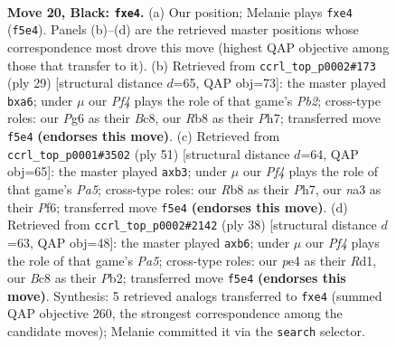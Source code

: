\documentclass[11pt]{article}
\begin{document}
\clearpage

\begin{figure}[p]\centering
\begin{subfigure}{0.46\textwidth}\centering
\resizebox{\linewidth}{!}{%
\newchessgame
\chessboard[
  setfen={1rb2r2/pp4k1/6pp/2pBbp1n/4P2P/N5P1/PP1PKP2/R1B1R3 b - - 0 20},
  showmover=false,
  pgfstyle=straightmove, color=movearrow, markmove={f5-e4}
]}
\caption{}
\end{subfigure}\hfill
\begin{subfigure}{0.46\textwidth}\centering
\resizebox{\linewidth}{!}{%
\newchessgame
\chessboard[
  setfen={r1br4/pp2kppp/P3p3/1Bbn4/8/2P2N2/1P2KPPP/R1BR4 b - - 0 15},
  showmover=false,
  pgfstyle=straightmove, color=movearrow, markmove={b7-a6}
]}
\caption{}
\end{subfigure}
\\[4pt]
\begin{subfigure}{0.46\textwidth}\centering
\resizebox{\linewidth}{!}{%
\newchessgame
\chessboard[
  setfen={rr4k1/3p2pp/2b1pp2/8/pnP4P/1P3P2/P5P1/1R1RBBK1 b - - 0 26},
  showmover=false,
  pgfstyle=straightmove, color=movearrow, markmove={a4-b3}
]}
\caption{}
\end{subfigure}\hfill
\begin{subfigure}{0.46\textwidth}\centering
\resizebox{\linewidth}{!}{%
\newchessgame
\chessboard[
  setfen={7r/p2rkp2/1p1bpn1p/P1pb4/8/4BNPP/1P2PPB1/R2R2K1 w - - 1 20},
  showmover=false,
  pgfstyle=straightmove, color=movearrow, markmove={a5-b6}
]}
\caption{}
\end{subfigure}
\caption{\textbf{Move 20, Black: \texttt{fxe4}.} (a) Our position; Melanie plays \texttt{fxe4} (\texttt{f5e4}). Panels (b)--(d) are the retrieved master positions whose correspondence most drove this move (highest QAP objective among those that transfer to it). (b) Retrieved from \texttt{ccrl\_top\_p0002\#173} (ply 29) [structural distance $d$=65, QAP obj=73]: the master played \texttt{bxa6}; under $\mu$ our \emph{Pf4} plays the role of that game's \emph{Pb2}; cross-type roles: our \emph{P}g6 as their \emph{B}c8, our \emph{R}b8 as their \emph{P}h7; transferred move \texttt{f5e4} \textbf{(endorses this move)}. (c) Retrieved from \texttt{ccrl\_top\_p0001\#3502} (ply 51) [structural distance $d$=64, QAP obj=65]: the master played \texttt{axb3}; under $\mu$ our \emph{Pf4} plays the role of that game's \emph{Pa5}; cross-type roles: our \emph{R}b8 as their \emph{P}h7, our \emph{n}a3 as their \emph{P}f6; transferred move \texttt{f5e4} \textbf{(endorses this move)}. (d) Retrieved from \texttt{ccrl\_top\_p0002\#2142} (ply 38) [structural distance $d$=63, QAP obj=48]: the master played \texttt{axb6}; under $\mu$ our \emph{Pf4} plays the role of that game's \emph{Pa5}; cross-type roles: our \emph{p}e4 as their \emph{R}d1, our \emph{B}c8 as their \emph{P}b2; transferred move \texttt{f5e4} \textbf{(endorses this move)}. Synthesis: 5 retrieved analogs transferred to \texttt{fxe4} (summed QAP objective 260, the strongest correspondence among the candidate moves); Melanie committed it via the \texttt{search} selector.}
\label{fig:thought-m39}
\end{figure}
\end{document}

